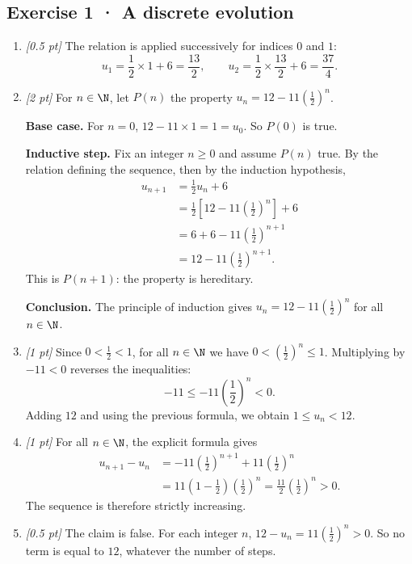 \subsection*{Exercise 1 · A discrete evolution}\begin{enumerate}

\item \textit{[0.5 pt]} The relation is applied successively for indices $0$ and $1$:\[u_1=\frac{1}{2}\times 1+6=\frac{13}{2},\qquad u_2=\frac{1}{2}\times \frac{13}{2}+6=\frac{37}{4}.\]

\item \textit{[2 pt]} For $n\in\N$, let $P(n)$ the property $u_n=12-11\left(\frac{1}{2}\right)^n$.
\par\smallskip\textbf{Base case.} For $n=0$, $12-11\times1=1=u_0$. So $P(0)$ is true.
\par\smallskip\textbf{Inductive step.} Fix an integer $n\ge0$ and assume $P(n)$ true. By the relation defining the sequence, then by the induction hypothesis,
\[\begin{aligned}u_{n+1}&=\frac{1}{2}u_n+6\\
&=\frac{1}{2}\left[12-11\left(\frac{1}{2}\right)^n\right]+6\\
&=6+6-11\left(\frac{1}{2}\right)^{n+1}\\
&=12-11\left(\frac{1}{2}\right)^{n+1}.
\end{aligned}\]
This is $P(n+1)$: the property is hereditary.
\par\smallskip\textbf{Conclusion.} The principle of induction gives $u_n=12-11\left(\frac{1}{2}\right)^n$ for all $n\in\N$.

\item \textit{[1 pt]} Since $0<\frac{1}{2}<1$, for all $n\in\N$ we have $0<(\frac{1}{2})^n\le1$. Multiplying by $-11<0$ reverses the inequalities:
\[-11\le-11(\frac{1}{2})^n<0.\]
Adding $12$ and using the previous formula, we obtain $1\le u_n<12$.

\item \textit{[1 pt]} For all $n\in\N$, the explicit formula gives
\[\begin{aligned}u_{n+1}-u_n&=-11(\frac{1}{2})^{n+1}+11(\frac{1}{2})^n\\&=11(1-\frac{1}{2})(\frac{1}{2})^n=\frac{11}{2}(\frac{1}{2})^n>0.\end{aligned}\]
The sequence is therefore strictly increasing.

\item \textit{[0.5 pt]} The claim is false. For each integer $n$, $12-u_n=11(\frac{1}{2})^n>0$. So no term is equal to $12$, whatever the number of steps.

\end{enumerate}

